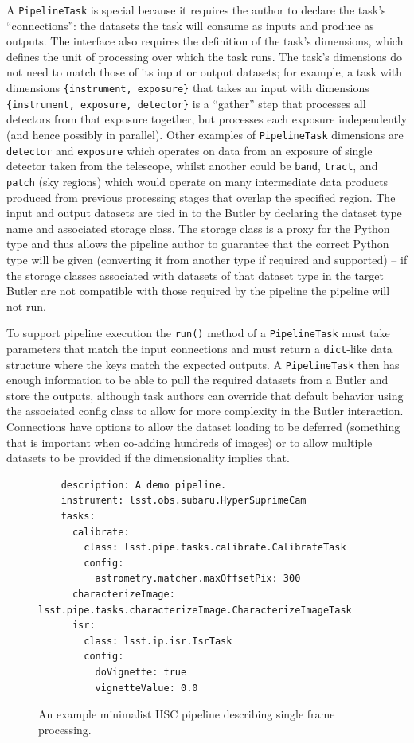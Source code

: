 \documentclass[]{spie}
\begin{document}
A \texttt{PipelineTask} is special because it requires the author to declare the task's ``connections'': the datasets the task will consume as inputs and produce as outputs.
The interface also requires the definition of the task's dimensions, which defines the unit of processing over which the task runs.
The task's dimensions do not need to match those of its input or output datasets; for example, a task with dimensions \texttt{\{instrument, exposure\}} that takes an input with dimensions \texttt{\{instrument, exposure, detector\}} is a ``gather'' step that processes all detectors from that exposure together, but processes each exposure independently (and hence possibly in parallel).
Other examples of \texttt{PipelineTask} dimensions are \texttt{detector} and \texttt{exposure} which operates on data from an exposure of single detector taken from the telescope, whilst another could be \texttt{band}, \texttt{tract}, and \texttt{patch} (sky regions) which would operate on many intermediate data products produced from previous processing stages that overlap the specified region.
The input and output datasets are tied in to the Butler by declaring the dataset type name and associated storage class.
The storage class is a proxy for the Python type and thus allows the pipeline author to guarantee that the correct Python type will be given (converting it from another type if required and supported) -- if the storage classes associated with datasets of that dataset type in the target Butler are not compatible with those required by the pipeline the pipeline will not run.

To support pipeline execution the \texttt{run()} method of a \texttt{PipelineTask} must take parameters that match the input connections and must return a \texttt{dict}-like data structure where the keys match the expected outputs.
A \texttt{PipelineTask} then has enough information to be able to pull the required datasets from a Butler and store the outputs, although task authors can override that default behavior using the associated config class to allow for more complexity in the Butler interaction.
Connections have options to allow the dataset loading to be deferred (something that is important when co-adding hundreds of images) or to allow multiple datasets to be provided if the dimensionality implies that.

\begin{figure}
  \lstset{language=YAML,basicstyle=\small\ttfamily}
  \begin{lstlisting}
    description: A demo pipeline.
    instrument: lsst.obs.subaru.HyperSuprimeCam
    tasks:
      calibrate:
        class: lsst.pipe.tasks.calibrate.CalibrateTask
        config:
          astrometry.matcher.maxOffsetPix: 300
      characterizeImage: lsst.pipe.tasks.characterizeImage.CharacterizeImageTask
      isr:
        class: lsst.ip.isr.IsrTask
        config:
          doVignette: true
          vignetteValue: 0.0
    \end{lstlisting}
  \caption{An example minimalist HSC pipeline describing single frame processing.}
  \label{fig:pipeline}
\end{figure}
\end{document}
